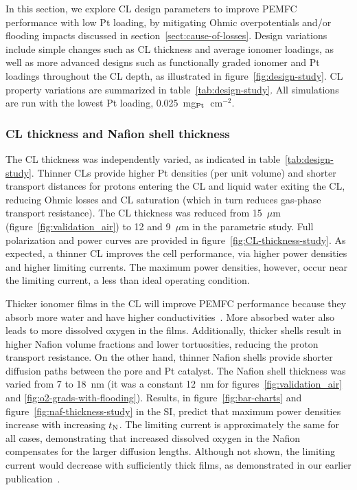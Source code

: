 \documentclass[final,3p,times,twocolumn]{elsarticle}    %
\begin{document}
In this section, we explore CL design parameters to improve PEMFC performance with low Pt loading, by mitigating Ohmic overpotentials and/or flooding impacts discussed in section~\ref{sect:cause-of-losses}. Design variations include simple changes such as CL thickness and average ionomer loadings, as well as more advanced designs such as functionally graded ionomer and Pt loadings throughout the CL depth, as illustrated in figure~\ref{fig:design-study}. CL property variations are summarized in table~\ref{tab:design-study}. All simulations are run with the lowest Pt loading, 0.025~mg$_{\rm Pt}$~cm$^{-2}$.

\subsubsection{CL thickness and Nafion shell thickness}

The CL thickness was independently varied, as indicated in table~\ref{tab:design-study}. Thinner CLs provide higher Pt densities (per unit volume) and shorter transport distances for protons entering the CL and liquid water exiting the CL, reducing Ohmic losses and CL saturation (which in turn reduces gas-phase transport resistance). The CL thickness was reduced from 15~$\mu$m (figure~\ref{fig:validation_air}) to 12 and 9~$\mu$m in the parametric study. Full polarization and power curves are provided in figure~\ref{fig:CL-thickness-study}. As expected, a thinner CL improves the cell performance, via higher power densities and higher limiting currents. The maximum power densities, however, occur near the limiting current, a less than ideal operating condition. 

Thicker ionomer films in the CL will improve PEMFC performance because they absorb more water and have higher conductivities~\cite{bib:decaluwe_2018, bib:kusoglu_2017, bib:eastman_2013}. More absorbed water also leads to more dissolved oxygen in the films. Additionally, thicker shells result in higher Nafion volume fractions and lower tortuosities, reducing the proton transport resistance. On the other hand, thinner Nafion shells provide shorter diffusion paths between the pore and Pt catalyst. The Nafion shell thickness was varied from 7 to 18~nm (it was a constant 12~nm for figures~\ref{fig:validation_air} and \ref{fig:o2-grads-with-flooding}). Results, in figure~\ref{fig:bar-charts} and figure~\ref{fig:naf-thickness-study} in the SI, predict that maximum power densities increase with increasing $t_{\rm N}$. The limiting current is approximately the same for all cases, demonstrating that increased dissolved oxygen in the Nafion compensates for the larger diffusion lengths. Although not shown, the limiting current would decrease with sufficiently thick films, as demonstrated in our earlier publication~\cite{bib:randall_2020}. %
\end{document}
